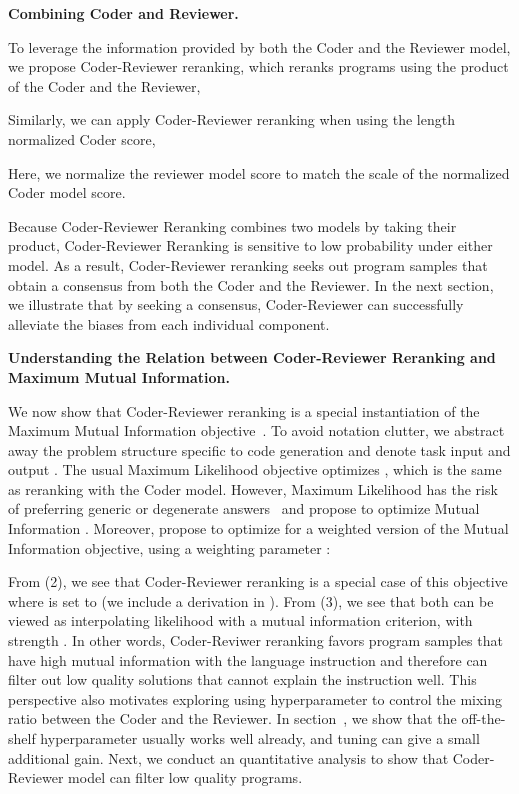 \documentclass[nohyperref]{article}
\theoremstyle{plain}
\theoremstyle{definition}
\theoremstyle{remark}
\renewcommand{\paragraph}[1]{
     \textbf{#1} 
 }
\begin{document}
\paragraph{Combining Coder and Reviewer.}
To leverage the information provided by both the Coder and the Reviewer model, we propose Coder-Reviewer reranking, which reranks programs using the product of the Coder and the Reviewer, 

Similarly, we can apply Coder-Reviewer reranking when using the length normalized Coder score,

Here, we normalize the reviewer model score  to match the scale of the normalized Coder model score.

Because Coder-Reviewer Reranking combines two models by taking their product, Coder-Reviewer Reranking is sensitive to low probability under either model.
As a result, Coder-Reviewer reranking seeks out program samples that obtain a consensus from both the Coder and the Reviewer.
In the next section, we illustrate that by seeking a consensus, Coder-Reviewer can successfully alleviate the biases from each individual component.

\paragraph{Understanding the Relation between Coder-Reviewer Reranking and Maximum Mutual Information.}
We now show that Coder-Reviewer reranking is a special instantiation of the Maximum Mutual Information objective~\citep{mmi-diversity}. 
To avoid notation clutter, we abstract away the problem structure specific to code generation and denote task input  and output .
The usual Maximum Likelihood objective optimizes , which is the same as reranking with the Coder model.
However, Maximum Likelihood has the risk of preferring generic or degenerate answers~\citep{curious-case} and \citet{mmi-diversity} propose to optimize Mutual Information .
Moreover, \citet{mmi-diversity} propose to optimize for a weighted version of the Mutual Information objective, using a weighting parameter :

From (2), we 
see that Coder-Reviewer reranking is a special case of this objective where  is set to  (we include a derivation in ).
From (3), we see that both can be viewed as interpolating likelihood with a mutual information criterion, with strength .
In other words, Coder-Reviwer reranking favors program samples that have high mutual information with the language instruction and therefore can filter out low quality solutions that cannot explain the instruction well.
This perspective also motivates exploring using hyperparameter  to control the mixing ratio between the Coder and the Reviewer.
In section~, we show that the off-the-shelf hyperparameter  usually works well already, and tuning  can give a small additional gain.
Next, we conduct an quantitative analysis to show that Coder-Reviewer model can filter low quality programs.
\end{document}
